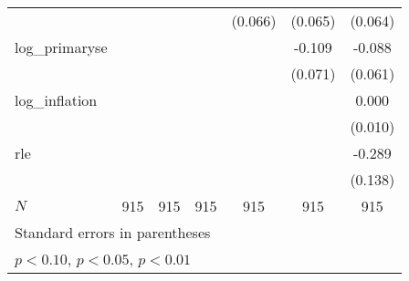 {\begin{tabular}{l*{6}{c}}
            &                     &                     &                     &     (0.066)         &     (0.065)         &     (0.064)         \\
\addlinespace
log\_primaryse&                     &                     &                     &                     &      -0.109         &      -0.088         \\
            &                     &                     &                     &                     &     (0.071)         &     (0.061)         \\
\addlinespace
log\_inflation&                     &                     &                     &                     &                     &       0.000         \\
            &                     &                     &                     &                     &                     &     (0.010)         \\
\addlinespace
rle         &                     &                     &                     &                     &                     &      -0.289\sym{**} \\
            &                     &                     &                     &                     &                     &     (0.138)         \\
\midrule
\(N\)       &         915         &         915         &         915         &         915         &         915         &         915         \\
\bottomrule
\multicolumn{7}{l}{\footnotesize Standard errors in parentheses}\\
\multicolumn{7}{l}{\footnotesize \sym{*} \(p<0.10\), \sym{**} \(p<0.05\), \sym{***} \(p<0.01\)}\\
\end{tabular}
}
